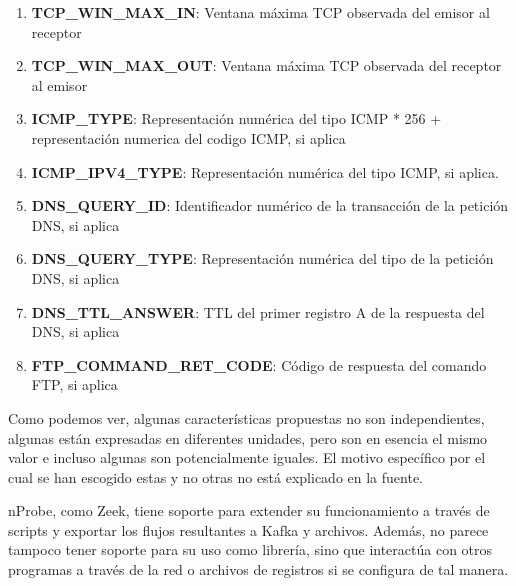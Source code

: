 \begin{enumerate}
    \item \textbf{TCP\_WIN\_MAX\_IN}: Ventana máxima TCP observada del emisor al receptor
    \item \textbf{TCP\_WIN\_MAX\_OUT}: Ventana máxima TCP observada del receptor al emisor
    \item \textbf{ICMP\_TYPE}: Representación numérica del tipo ICMP * 256 + representación numerica del codigo ICMP, si aplica
    \item \textbf{ICMP\_IPV4\_TYPE}: Representación numérica del tipo ICMP, si aplica.
    \item \textbf{DNS\_QUERY\_ID}: Identificador numérico de la transacción de la petición DNS, si aplica
    \item \textbf{DNS\_QUERY\_TYPE}: Representación numérica del tipo de la petición DNS, si aplica
    \item \textbf{DNS\_TTL\_ANSWER}: TTL del primer registro A de la respuesta del DNS, si aplica
    \item \textbf{FTP\_COMMAND\_RET\_CODE}: Código de respuesta del comando FTP, si aplica
\end{enumerate}

Como podemos ver, algunas características propuestas no son independientes, algunas están expresadas en diferentes unidades, pero son en esencia el mismo valor e incluso algunas son potencialmente iguales. El motivo específico por el cual se han escogido estas y no otras no está explicado en la fuente.

nProbe, como Zeek, tiene soporte para extender su funcionamiento a través de scripts y exportar los flujos resultantes a Kafka y archivos. Además, no parece tampoco tener soporte para su uso como librería, sino que interactúa con otros programas a través de la red o archivos de registros si se configura de tal manera.
